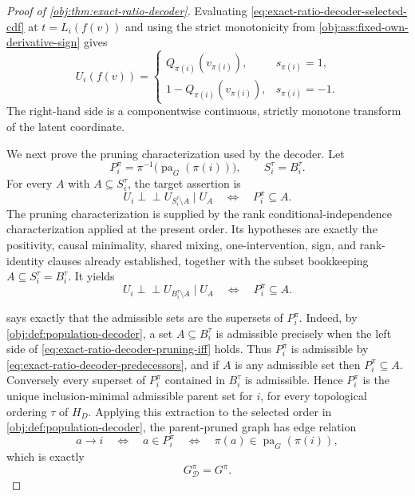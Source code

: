 \begin{proof}[Proof of \cref{obj:thm:exact-ratio-decoder}]
Evaluating \cref{eq:exact-ratio-decoder-selected-cdf} at \(t=L_i(f(v))\) and using the strict monotonicity from \cref{obj:ass:fixed-own-derivative-sign} gives
\begin{equation}
U_i(f(v))
=
\begin{cases}
Q_{\pi(i)}(v_{\pi(i)}), & s_{\pi(i)}=1,\\
1-Q_{\pi(i)}(v_{\pi(i)}), & s_{\pi(i)}=-1.
\end{cases}
\label{eq:exact-ratio-decoder-rank-coordinate}
\end{equation}
The right-hand side is a componentwise continuous, strictly monotone transform of the latent coordinate. %

We next prove the pruning characterization used by the decoder. Let
\[
P_i^\pi=\pi^{-1}\!\bigl(\operatorname{pa}_G(\pi(i))\bigr),
\qquad
S_i^\tau=B_i^\tau.
\]
For every \(A\) with \(A\subseteq S_i^\tau\), the target assertion is
\begin{equation}
U_i\perp\!\!\!\perp U_{S_i^\tau\setminus A}\mid U_A
\quad\Longleftrightarrow\quad
P_i^\pi\subseteq A.
\label{eq:exact-ratio-decoder-pruning-claim}
\end{equation}
The pruning characterization is supplied by the rank conditional-independence characterization applied at the present order. Its hypotheses are exactly the positivity, causal minimality, shared mixing, one-intervention, sign, and rank-identity clauses already established, together with the subset bookkeeping \(A\subseteq S_i^\tau=B_i^\tau\). It yields
\begin{equation}
U_i\perp\!\!\!\perp U_{B_i^\tau\setminus A}\mid U_A
\quad\Longleftrightarrow\quad
P_i^\pi\subseteq A.
\label{eq:exact-ratio-decoder-pruning-iff}
\end{equation}

 says exactly that the admissible sets are the supersets of \(P_i^\pi\). Indeed, by \cref{obj:def:population-decoder}, a set \(A\subseteq B_i^\tau\) is admissible precisely when the left side of \cref{eq:exact-ratio-decoder-pruning-iff} holds. Thus \(P_i^\pi\) is admissible by \cref{eq:exact-ratio-decoder-predecessors}, and if \(A\) is any admissible set then \(P_i^\pi\subseteq A\). Conversely every superset of \(P_i^\pi\) contained in \(B_i^\tau\) is admissible. Hence \(P_i^\pi\) is the unique inclusion-minimal admissible parent set for \(i\), for every topological ordering \(\tau\) of \(H_D\). Applying this extraction to the selected order in \cref{obj:def:population-decoder}, the parent-pruned graph has edge relation
\[
a\to i
\quad\Longleftrightarrow\quad
a\in P_i^\pi
\quad\Longleftrightarrow\quad
\pi(a)\in\operatorname{pa}_G(\pi(i)),
\]
which is exactly
\begin{equation}
G_{\mathscr D}^\pi=G^\pi.
\label{eq:exact-ratio-decoder-selected-graph}
\end{equation}


\end{proof}
